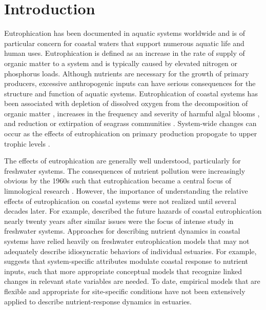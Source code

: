 \documentclass[letterpaper,12pt,oneside]{article}\usepackage[]{graphicx}\usepackage[]{color}
\begin{document}
\section{Introduction} \label{intro}

Eutrophication has been documented in aquatic systems worldwide and is of particular concern for coastal waters that support numerous aquatic life and human uses.  Eutrophication is defined as an increase in the rate of supply of organic matter to a system \citep{Nixon95} and is typically caused by elevated nitrogen or phosphorus loads.  Although nutrients are necessary for the growth of primary producers, excessive anthropogenic inputs can have serious consequences for the structure and function of aquatic systems.  Eutrophication of coastal systems has been associated with depletion of dissolved oxygen from the decomposition of organic matter \citep{Diaz08}, increases in the frequency and severity of harmful algal blooms \citep{Glibert13}, and reduction or extirpation of seagrass communities \citep{Duarte95,Tomasko05}.  System-wide changes can occur as the effects of eutrophication on primary production propogate to upper trophic levels \citep{Powers05}. 

The effects of eutrophication are generally well understood, particularly for freshwater systems. The consequences of nutrient pollution were increasingly obvious by the 1960s such that eutrophication became a central focus of limnological research \citep{Cloern01}.  However, the importance of understanding the relative effects of eutrophication on coastal systems were not realized until several decades later.  For example, \citet{Rosenberg85} described the future hazards of coastal eutrophication nearly twenty years after similar issues were the focus of intense study in freshwater systems.  Approaches for describing nutrient dynamics in coastal systems have relied heavily on freshwater eutrophication models that may not adequately describe idiosyncratic behaviors of individual estuaries.  For example, \citet{Cloern01} suggests that system-specific attributes modulate coastal response to nutrient inputs, such that more appropriate conceptual models that recognize linked changes in relevant state variables are needed.  To date, empirical models that are flexible and appropriate for site-specific conditions have not been extensively applied to describe nutrient-response dynamics in estuaries.
\end{document}
